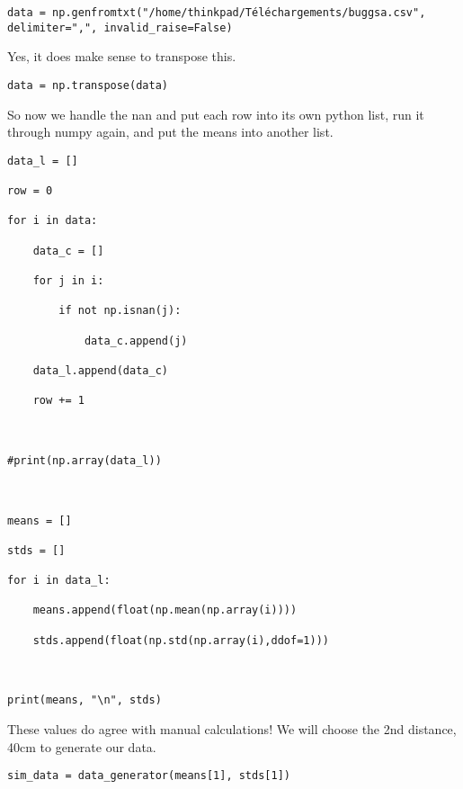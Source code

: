 \documentclass[12pt]{article}
\begin{document}
\begin{lstlisting}[frame=shadowbox]
data = np.genfromtxt("/home/thinkpad/Téléchargements/buggsa.csv", delimiter=",", invalid_raise=False)
\end{lstlisting}


Yes, it does make sense to transpose this.


\begin{lstlisting}[frame=shadowbox]
data = np.transpose(data)
\end{lstlisting}


So now we handle the nan and put each row into its own python list, run it through numpy again, and put the means into another list.


\begin{lstlisting}[frame=shadowbox]
data_l = []

row = 0

for i in data:

    data_c = []

    for j in i:

        if not np.isnan(j):

            data_c.append(j)

    data_l.append(data_c)

    row += 1



#print(np.array(data_l))



means = []

stds = []

for i in data_l:

    means.append(float(np.mean(np.array(i))))

    stds.append(float(np.std(np.array(i),ddof=1)))



print(means, "\n", stds)
\end{lstlisting}



These values do agree with manual calculations! We will choose the 2nd distance, 40cm to generate our data.


\begin{lstlisting}[frame=shadowbox]
sim_data = data_generator(means[1], stds[1])
\end{lstlisting}
\end{document}

